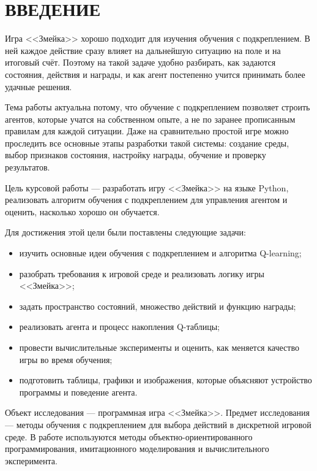 \chapter*{\large ВВЕДЕНИЕ}

Игра <<Змейка>> хорошо подходит для изучения обучения с подкреплением. В ней каждое действие сразу влияет на дальнейшую ситуацию на поле и на итоговый счёт. Поэтому на такой задаче удобно разбирать, как задаются состояния, действия и награды, и как агент постепенно учится принимать более удачные решения.

Тема работы актуальна потому, что обучение с подкреплением позволяет строить агентов, которые учатся на собственном опыте, а не по заранее прописанным правилам для каждой ситуации. Даже на сравнительно простой игре можно проследить все основные этапы разработки такой системы: создание среды, выбор признаков состояния, настройку награды, обучение и проверку результатов.

Цель курсовой работы --- разработать игру <<Змейка>> на языке Python, реализовать алгоритм обучения с подкреплением для управления агентом и оценить, насколько хорошо он обучается.

Для достижения этой цели были поставлены следующие задачи:
\begin{itemize}
    \item изучить основные идеи обучения с подкреплением и алгоритма Q-learning;
    \item разобрать требования к игровой среде и реализовать логику игры <<Змейка>>;
    \item задать пространство состояний, множество действий и функцию награды;
    \item реализовать агента и процесс накопления Q-таблицы;
    \item провести вычислительные эксперименты и оценить, как меняется качество игры во время обучения;
    \item подготовить таблицы, графики и изображения, которые объясняют устройство программы и поведение агента.
\end{itemize}

Объект исследования --- программная игра <<Змейка>>. Предмет исследования --- методы обучения с подкреплением для выбора действий в дискретной игровой среде. В работе используются методы объектно-ориентированного программирования, имитационного моделирования и вычислительного эксперимента.
